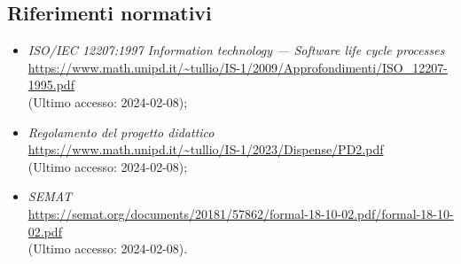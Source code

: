 \documentclass[10pt, a4paper]{article}
\begin{document}
    \subsection{Riferimenti normativi}
    \begin{itemize}
        \item \textit{ISO/IEC 12207:1997 Information technology — Software life cycle processes}\\
        \url{https://www.math.unipd.it/~tullio/IS-1/2009/Approfondimenti/ISO_12207-1995.pdf}\\
        (Ultimo accesso: 2024-02-08);
        \item \textit{Regolamento del progetto didattico}\\
        \url{https://www.math.unipd.it/~tullio/IS-1/2023/Dispense/PD2.pdf}\\
        (Ultimo accesso: 2024-02-08);
        \item \textit{SEMAT}\\
        \url{https://semat.org/documents/20181/57862/formal-18-10-02.pdf/formal-18-10-02.pdf}\\ 
        (Ultimo accesso: 2024-02-08).
    \end{itemize}
\end{document}
